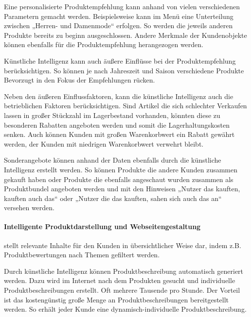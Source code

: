 Eine personalisierte Produktempfehlung kann anhand von vielen verschiedenen Parametern gemacht werden. Beispielsweise kann im Menü eine Unterteilung zwischen „Herren- und Damenmode“ erfolgen. So werden die jeweils anderen Produkte bereits zu beginn ausgeschlossen. Andere Merkmale der Kundenobjekte können ebenfalls für die Produktempfehlung herangezogen werden.\vspace{0.2cm}

Künstliche Intelligenz kann auch äußere Einflüsse bei der Produktempfehlung berücksichtigen. So können je nach Jahreszeit und Saison verschiedene Produkte Bevorzugt in den Fokus der Empfehlungen rücken.\vspace{0.2cm}

Neben den äußeren Einflussfaktoren, kann die künstliche Intelligenz auch die betrieblichen Faktoren berücksichtigen. Sind Artikel die sich schlechter Verkaufen lassen in großer Stückzahl im  Lagerbestand vorhanden, könnten diese zu besonderen Rabatten angeboten werden und somit die Lagerhaltungskosten senken. Auch können Kunden mit großen Warenkorbwert ein Rabatt gewährt werden, der Kunden mit niedrigen Warenkorbwert verwehrt bleibt.\vspace{0.2cm}

Sonderangebote können anhand der Daten ebenfalls durch die künstliche Intelligenz erstellt werden. So können Produkte die andere Kunden zusammen gekauft haben oder Produkte die ebenfalls angeschaut wurden zusammen als Produktbundel angeboten werden und mit den Hinweisen „Nutzer das kauften, kauften auch das“ oder „Nutzer die das kauften, sahen sich auch das an“ versehen werden.

\paragraph{Intelligente Produktdarstellung und Webseitengestaltung} stellt relevante Inhalte für den Kunden in übersichtlicher Weise dar, indem z.B. Produktbewertungen nach Themen gefiltert werden.\vspace{0.2cm}

Durch künstliche Intelligenz können Produktbeschreibung automatisch generiert werden. Dazu wird im Internet nach dem Produkten gesucht und individuelle Produktbeschreibungen erstellt. Oft mehrere Tausende pro Stunde. Der Vorteil ist das kostengünstig große Menge an Produktbeschreibungen bereitgestellt werden. So erhält jeder Kunde eine dynamisch-individuelle Produktbeschreibung.\vspace{0.2cm}

